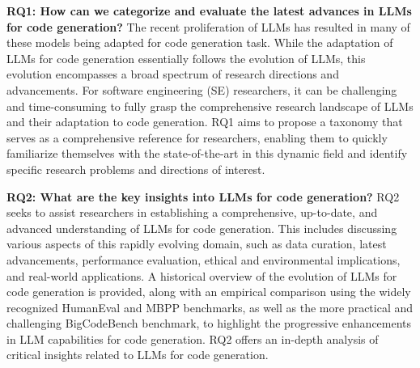 \textbf{RQ1: How can we categorize and evaluate the latest advances in LLMs for code generation?}
The recent proliferation of LLMs has resulted in many of these models being adapted for code generation task. 
While the adaptation of LLMs for code generation essentially follows the evolution of LLMs, this evolution encompasses a broad spectrum of research directions and advancements. 
For software engineering (SE) researchers, it can be challenging and time-consuming to fully grasp the comprehensive research landscape of LLMs and their adaptation to code generation. 
RQ1 aims to propose a taxonomy that serves as a comprehensive reference for researchers, enabling them to quickly familiarize themselves with the state-of-the-art in this dynamic field and identify specific research problems and directions of interest.

\textbf{RQ2: What are the key insights into LLMs for code generation?}
RQ2 seeks to assist researchers in establishing a comprehensive, up-to-date, and advanced understanding of LLMs for code generation. 
This includes discussing various aspects of this rapidly evolving domain, such as data curation, latest advancements, performance evaluation, ethical and environmental implications, and real-world applications. 
A historical overview of the evolution of LLMs for code generation is provided, along with an empirical comparison using the widely recognized HumanEval and MBPP benchmarks, as well as the more practical and challenging BigCodeBench benchmark, to highlight the progressive enhancements in LLM capabilities for code generation.
RQ2 offers an in-depth analysis of critical insights related to LLMs for code generation.


